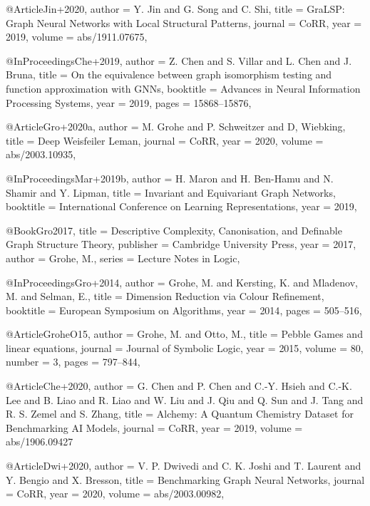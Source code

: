 @Article{Jin+2020,
  author  = {Y. Jin and G. Song and C. Shi},
  title   = {{GraLSP:} {G}raph Neural Networks with Local Structural Patterns},
  journal = {CoRR},
  year    = {2019},
  volume  = {abs/1911.07675},
}

@InProceedings{Che+2019,
  author    = {Z. Chen and S. Villar and L. Chen and J. Bruna},
  title     = {On the equivalence between graph isomorphism testing and function approximation with {GNN}s},
  booktitle = {Advances in Neural Information Processing Systems},
  year      = {2019},
  pages     = {15868--15876},
}

@Article{Gro+2020a,
  author  = {M. Grohe and P. Schweitzer and D, Wiebking},
  title   = {Deep {Weisfeiler Leman}},
  journal = {CoRR},
  year    = {2020},
  volume  = {abs/2003.10935},
}

@InProceedings{Mar+2019b,
  author    = {H. Maron and H. Ben{-}Hamu and N. Shamir and Y. Lipman},
  title     = {Invariant and Equivariant Graph Networks},
  booktitle = {International Conference on Learning Representations},
  year      = {2019},
}

@Book{Gro2017,
  title     = {Descriptive Complexity, Canonisation, and Definable Graph Structure Theory},
  publisher = {Cambridge University Press},
  year      = {2017},
  author    = {Grohe, M.},
  series    = {Lecture Notes in Logic},
}

@InProceedings{Gro+2014,
  author    = {Grohe, M. and Kersting, K. and Mladenov, M. and Selman, E.},
  title     = {Dimension Reduction via Colour Refinement},
  booktitle = {European Symposium on Algorithms},
  year      = {2014},
  pages     = {505--516},
}

@Article{GroheO15,
  author    = {Grohe, M. and Otto, M.},
  title     = {Pebble Games and linear equations},
  journal   = {Journal of Symbolic Logic},
  year      = {2015},
  volume    = {80},
  number    = {3},
  pages     = {797--844},
}

@Article{Che+2020,
  author  = {G. Chen and P. Chen and C.{-}Y. Hsieh and C.{-}K. Lee and B. Liao and R. Liao and W. Liu and J. Qiu and Q. Sun and J. Tang and R. S. Zemel and S. Zhang},
  title   = {Alchemy: {A} Quantum Chemistry Dataset for Benchmarking {AI} Models},
  journal = {CoRR},
  year    = {2019},
  volume  = {abs/1906.09427}
}

@Article{Dwi+2020,
  author  = {V. P. Dwivedi and C. K. Joshi and T. Laurent and Y. Bengio and X. Bresson},
  title   = {Benchmarking Graph Neural Networks},
  journal = {CoRR},
  year    = {2020},
  volume  = {abs/2003.00982},
}

